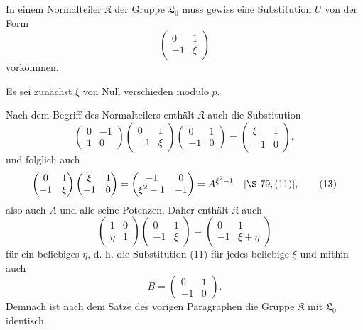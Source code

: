\documentclass[11pt]{article}
\providecommand{\Lzero}{\mathfrak L_0}
\providecommand{\Kgrp}{\mathfrak K}
\begin{document}
In einem Normalteiler $\Kgrp$ der Gruppe $\Lzero$ muss gewiss eine Substitution $U$ von der Form
\begin{equation}
 \begin{pmatrix}0&1\\-1&\xi\end{pmatrix}
\tag{11}
\end{equation}
vorkommen.

Es sei zunächst $\xi$ von Null verschieden modulo $p$.

Nach dem Begriff des Normalteilers enthält $\Kgrp$ auch die Substitution
\begin{equation}
 \begin{pmatrix}0&-1\\1&0\end{pmatrix}
 \begin{pmatrix}0&1\\-1&\xi\end{pmatrix}
 \begin{pmatrix}0&1\\-1&0\end{pmatrix}
 =
 \begin{pmatrix}\xi&1\\-1&0\end{pmatrix},
\tag{12}
\end{equation}
und folglich auch
\begin{equation}
 \begin{pmatrix}0&1\\-1&\xi\end{pmatrix}
 \begin{pmatrix}\xi&1\\-1&0\end{pmatrix}
 =
 \begin{pmatrix}-1&0\\ \xi^2-1&-1\end{pmatrix}
 =A^{\xi^2-1}\quad[\S~79,(11)],
\tag{13}
\end{equation}
also auch $A$ und alle seine Potenzen. Daher enthält $\Kgrp$ auch
\begin{equation}
 \begin{pmatrix}1&0\\ \eta&1\end{pmatrix}
 \begin{pmatrix}0&1\\-1&\xi\end{pmatrix}
 =
 \begin{pmatrix}0&1\\-1&\xi+
\eta\end{pmatrix}
\tag{14}
\end{equation}
für ein beliebiges $\eta$, d. h. die Substitution (11) für jedes beliebige $\xi$ und mithin auch
\[
 B=\begin{pmatrix}0&1\\-1&0\end{pmatrix}.
\]
Demnach ist nach dem Satze des vorigen Paragraphen die Gruppe $\Kgrp$ mit $\Lzero$ identisch.
\end{document}
